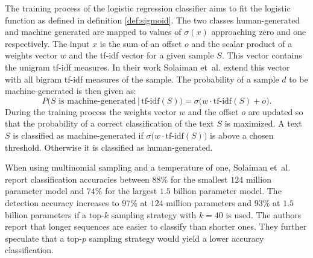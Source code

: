    The training process of the logistic regression classifier aims to fit the logistic function as defined in definition \ref{def:sigmoid}.
    The two classes human-generated and machine generated are mapped to values of $\sigma(x)$ approaching zero and one respectively.
    The input $x$ is the sum of an offset $o$ and the scalar product of a weights vector $w$ and the tf-idf vector for a given sample $S$.
    This vector contains the unigram tf-idf measures.
    In their work Solaiman et~al. \cite{solaiman2019release} extend this vector with all bigram tf-idf measures of the sample.
    The probability of a sample $d$ to be machine-generated is then given as:
    \begin{equation}
        P\big(S \text{ is machine-generated}\, |\, \text{tf-idf}(S)\big) = \sigma \big( w \cdot \text{tf-idf}(S) + o \big) \text{.}
    \end{equation}
    During the training process the weights vector $w$ and the offset $o$ are updated so that the probability of a correct classification of the text $S$ is maximized.
    A text $S$ is classified as machine-generated if $\sigma \big(w \cdot \text{tf-idf}(S)\big)$ is above a chosen threshold.
    Otherwise it is classified as human-generated.

    When using multinomial sampling and a temperature of one, Solaiman et~al. \cite{solaiman2019release} report classification accuracies between $88\%$ for the smallest $124$ million parameter model and $74\%$ for the largest $1.5$ billion parameter model.
    The detection accuracy increases to $97\%$ at $124$ million parameters and $93\%$ at $1.5$ billion parameters if a top-$k$ sampling strategy with $k=40$ is used.
    The authors report that longer sequences are easier to classify than shorter ones.
    They further speculate that a top-$p$ sampling strategy would yield a lower accuracy classification.

